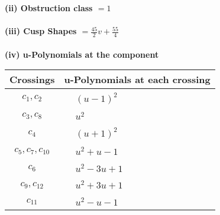\documentclass[1p]{elsarticle_modified}
\theoremstyle{definition}
\begin{document}
\flushleft \textbf{(ii) Obstruction class $= 1$}\\~\\
\flushleft \textbf{(iii) Cusp Shapes $= \frac{45}{2} v+\frac{55}{4}$}\\~\\
\newpage\renewcommand{\arraystretch}{1}
\flushleft \textbf{(iv) u-Polynomials at the component}\newline \\
\begin{tabular}{m{50pt}|m{274pt}}
Crossings & \hspace{64pt}u-Polynomials at each crossing \\
\hline $$\begin{aligned}c_{1},c_{2}\end{aligned}$$&$\begin{aligned}
&(u-1)^2
\end{aligned}$\\
\hline $$\begin{aligned}c_{3},c_{8}\end{aligned}$$&$\begin{aligned}
&u^2
\end{aligned}$\\
\hline $$\begin{aligned}c_{4}\end{aligned}$$&$\begin{aligned}
&(u+1)^2
\end{aligned}$\\
\hline $$\begin{aligned}c_{5},c_{7},c_{10}\end{aligned}$$&$\begin{aligned}
&u^2+u-1
\end{aligned}$\\
\hline $$\begin{aligned}c_{6}\end{aligned}$$&$\begin{aligned}
&u^2-3 u+1
\end{aligned}$\\
\hline $$\begin{aligned}c_{9},c_{12}\end{aligned}$$&$\begin{aligned}
&u^2+3 u+1
\end{aligned}$\\
\hline $$\begin{aligned}c_{11}\end{aligned}$$&$\begin{aligned}
&u^2- u-1
\end{aligned}$\\
\hline
\end{tabular}\\~\\
\end{document}
